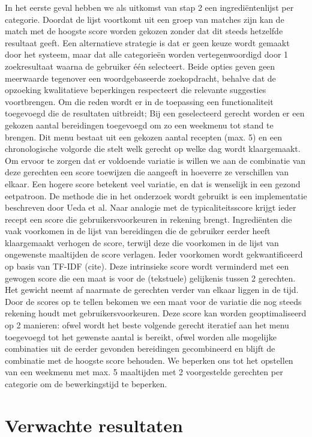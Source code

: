 \documentclass{hogent-article}
\begin{document}
In het eerste geval hebben we als uitkomst van stap 2 een ingrediëntenlijst per categorie. Doordat de lijst voortkomt uit een groep van matches zijn kan de match met de hoogste score worden gekozen zonder dat dit steeds hetzelfde resultaat geeft. Een alternatieve strategie is dat er geen keuze wordt gemaakt door het systeem, maar dat alle categorieën worden vertegenwoordigd door 1 zoekresultaat waarna de gebruiker één selecteert.
Beide opties geven geen meerwaarde tegenover een woordgebaseerde zoekopdracht, behalve dat de opzoeking kwalitatieve beperkingen respecteert die relevante suggesties voortbrengen. Om die reden wordt er in de toepassing een functionaliteit toegevoegd die de resultaten uitbreidt; Bij een geselecteerd gerecht worden er een gekozen aantal bereidingen toegevoegd om zo een weekmenu tot stand te brengen. Dit menu bestaat uit een gekozen aantal recepten (max. 5) en een chronologische volgorde die stelt welk gerecht op welke dag wordt klaargemaakt. Om ervoor te zorgen dat er voldoende variatie is willen we aan de combinatie van deze gerechten een score toewijzen die aangeeft in hoeverre ze verschillen van elkaar. Een hogere score betekent veel variatie, en dat is wenselijk in een gezond eetpatroon. 
De methode die in het onderzoek wordt gebruikt is een implementatie beschreven door Ueda et al. Naar analogie met de typicaliteitsscore krijgt ieder recept een score die gebruikersvoorkeuren in rekening brengt. Ingrediënten die vaak voorkomen in de lijst van bereidingen die de gebruiker eerder heeft klaargemaakt verhogen de score, terwijl deze die voorkomen in de lijst van ongewenste maaltijden de score verlagen. Ieder voorkomen wordt gekwantificeerd op basis van TF-IDF (cite). Deze intrinsieke score wordt verminderd met een gewogen score die een maat is voor de (tekstuele) gelijkenis tussen 2 gerechten. Het gewicht neemt af naarmate de gerechten verder van elkaar liggen in de tijd.
Door de scores op te tellen bekomen we een maat voor de variatie die nog steeds rekening houdt met gebruikersvoorkeuren. Deze score kan worden geoptimaliseerd op 2 manieren: ofwel wordt het beste volgende gerecht iteratief aan het menu toegevoegd tot het gewenste aantal is bereikt, ofwel worden alle mogelijke combinaties uit de eerder gevonden bereidingen gecombineerd en blijft de combinatie met de hoogste score behouden. We beperken ons tot het opstellen van een weekmenu met max. 5 maaltijden met 2 voorgestelde gerechten per categorie om de bewerkingstijd te beperken.

\section{Verwachte resultaten}%
\label{sec:verwachte-resultaten}
\end{document}
